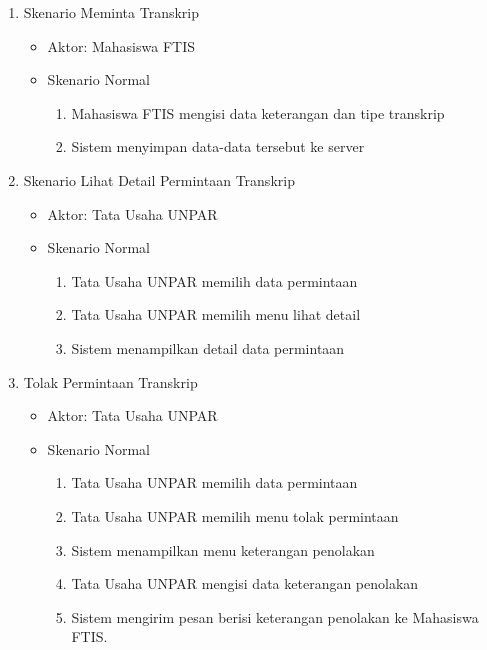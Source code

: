 \begin{enumerate}
	\item Skenario Meminta Transkrip
	\begin{itemize}
		\item Aktor: Mahasiswa FTIS
		\item Skenario Normal
			\begin{enumerate}[1.]
				\item Mahasiswa FTIS mengisi data keterangan dan tipe transkrip 
				\item Sistem menyimpan data-data tersebut ke server 
			\end{enumerate}
	\end{itemize}
	
	\item Skenario Lihat Detail Permintaan Transkrip
	\begin{itemize}
		\item Aktor: Tata Usaha UNPAR
		\item Skenario Normal
			\begin{enumerate}[1.]
				\item Tata Usaha UNPAR memilih data permintaan
				\item Tata Usaha UNPAR memilih menu lihat detail
				\item Sistem menampilkan detail data permintaan
			\end{enumerate}
	\end{itemize}
	
	\item Tolak Permintaan Transkrip
	\begin{itemize}
		\item Aktor: Tata Usaha UNPAR
		\item Skenario Normal
			\begin{enumerate}[1.]
				\item Tata Usaha UNPAR memilih data permintaan
				\item Tata Usaha UNPAR memilih menu tolak permintaan
				\item Sistem menampilkan menu keterangan penolakan
				\item Tata Usaha UNPAR mengisi data keterangan penolakan
				\item Sistem mengirim pesan berisi keterangan penolakan ke Mahasiswa FTIS.
			\end{enumerate}
	\end{itemize}
	

\end{enumerate}
